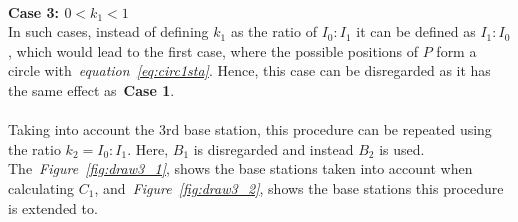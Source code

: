 \documentclass[a4paper,12pt]{article}
\begin{document}
\\
\textbf{Case 3: $0<k_1<1$}\\
In such cases, instead of defining $k_1$ as the ratio of $I_0:I_1$ it can be defined as $I_1:I_0$, which would lead to the first case, where the possible positions of $P$ form a circle with~\textit{equation~\ref{eq:circ1sta}}. 
Hence, this case can be disregarded as it has the same effect as~\textbf{Case 1}.
\\\\
Taking into account the 3rd base station, this procedure can be repeated using the ratio $k_2=I_0:I_1$. Here, $B_1$ is disregarded and instead $B_2$ is used. The~\textit{Figure~\ref{fig:draw3_1}}, shows the base stations taken into account when calculating $C_1$, and~\textit{Figure~\ref{fig:draw3_2}},
shows the base stations this procedure is extended to. 
\end{document}
